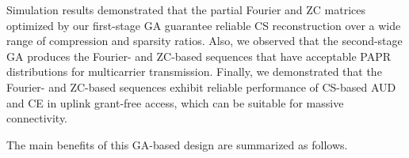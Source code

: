 \documentclass[journal]{IEEEtran}
\numberwithin{const2}{const}
\begin{document}
Simulation results demonstrated that the
partial Fourier and ZC matrices optimized by our first-stage GA guarantee reliable CS reconstruction
over a wide range of compression and sparsity ratios.
Also, we observed that the second-stage GA produces
the Fourier- and ZC-based sequences that have acceptable PAPR distributions
for multicarrier transmission.
Finally, we demonstrated that %
the Fourier- and ZC-based sequences exhibit reliable performance of CS-based AUD and CE in uplink grant-free access,
which can be suitable for massive connectivity.

The main benefits of this GA-based design are summarized as follows.
\end{document}
